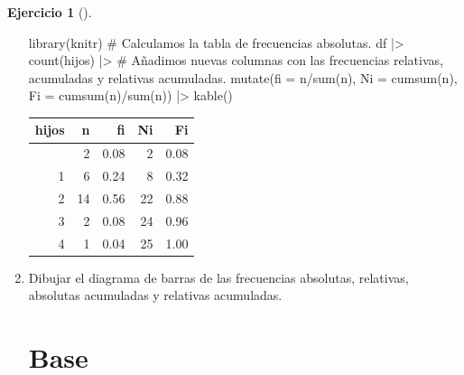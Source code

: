 \documentclass[
  spanish,
  a4paper,
]{scrreport}
\newenvironment{Shaded}{\begin{snugshade}}{\end{snugshade}}
\newcommand{\AttributeTok}[1]{\textcolor[rgb]{0.40,0.45,0.13}{#1}}
\newcommand{\CommentTok}[1]{\textcolor[rgb]{0.37,0.37,0.37}{#1}}
\newcommand{\FunctionTok}[1]{\textcolor[rgb]{0.28,0.35,0.67}{#1}}
\newcommand{\NormalTok}[1]{\textcolor[rgb]{0.00,0.23,0.31}{#1}}
\newcommand{\SpecialCharTok}[1]{\textcolor[rgb]{0.37,0.37,0.37}{#1}}
\theoremstyle{definition}
\newtheorem{exercise}{Ejercicio}[chapter]
\theoremstyle{remark}
\begin{document}
\begin{exercise}[]
\begin{enumerate}
\begin{tcolorbox}
\begin{Shaded}
\begin{Highlighting}[]
\FunctionTok{library}\NormalTok{(knitr)}
\CommentTok{\# Calculamos la tabla de frecuencias absolutas.}
\NormalTok{df }\SpecialCharTok{|\textgreater{}} \FunctionTok{count}\NormalTok{(hijos) }\SpecialCharTok{|\textgreater{}}
    \CommentTok{\# Añadimos nuevas columnas con las frecuencias relativas, acumuladas y relativas acumuladas.}
    \FunctionTok{mutate}\NormalTok{(}\AttributeTok{fi =}\NormalTok{ n}\SpecialCharTok{/}\FunctionTok{sum}\NormalTok{(n), }\AttributeTok{Ni =} \FunctionTok{cumsum}\NormalTok{(n), }\AttributeTok{Fi =} \FunctionTok{cumsum}\NormalTok{(n)}\SpecialCharTok{/}\FunctionTok{sum}\NormalTok{(n)) }\SpecialCharTok{|\textgreater{}}
    \FunctionTok{kable}\NormalTok{()}
\end{Highlighting}
\end{Shaded}

  \begin{longtable}[]{@{}rrrrr@{}}
  \toprule\noalign{}
  hijos & n & fi & Ni & Fi \\
  \midrule\noalign{}
  \endhead
  \bottomrule\noalign{}
  \endlastfoot
  0 & 2 & 0.08 & 2 & 0.08 \\
  1 & 6 & 0.24 & 8 & 0.32 \\
  2 & 14 & 0.56 & 22 & 0.88 \\
  3 & 2 & 0.08 & 24 & 0.96 \\
  4 & 1 & 0.04 & 25 & 1.00 \\
  \end{longtable}

  \end{tcolorbox}
\item
  Dibujar el diagrama de barras de las frecuencias absolutas, relativas,
  absolutas acumuladas y relativas acumuladas.

  \begin{tcolorbox}[enhanced jigsaw, titlerule=0mm, arc=.35mm, rightrule=.15mm, opacitybacktitle=0.6, leftrule=.75mm, colframe=quarto-callout-tip-color-frame, toptitle=1mm, breakable, colbacktitle=quarto-callout-tip-color!10!white, bottomrule=.15mm, colback=white, left=2mm, bottomtitle=1mm, opacityback=0, title=\textcolor{quarto-callout-tip-color}{\faLightbulb}\hspace{0.5em}{Solución}, toprule=.15mm, coltitle=black]

  \section{Base}


\end{tcolorbox}
\end{enumerate}
\end{exercise}
\end{document}
